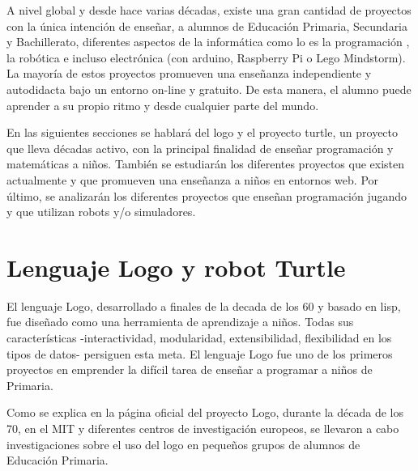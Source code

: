 A nivel global y desde hace varias décadas, existe una gran cantidad de proyectos con la única intención de enseñar, a alumnos de Educación Primaria, Secundaria y Bachillerato, diferentes aspectos de la informática como lo es la programación \cite{code-school,code-org,code-academy}, la robótica \cite{robomind-web,moway} e incluso electrónica (con \Gls{arduino}\cite{arduino}, Raspberry Pi\cite{raspberry-pi} o Lego Mindstorm\cite{lego-mindstorm-programar}).
La mayoría de estos proyectos promueven una enseñanza independiente y autodidacta bajo un entorno on-line y gratuito. De esta manera, el alumno puede aprender a su propio ritmo y desde cualquier parte del mundo.

En las siguientes secciones se hablará del \Gls{logo}\cite{logo} y el proyecto \Gls{turtle}\cite{logo-turtle}, un proyecto que lleva décadas activo, con la principal finalidad de enseñar programación y matemáticas a niños. También se estudiarán los diferentes proyectos que existen actualmente y que promueven una enseñanza a niños en entornos web. Por último, se analizarán los diferentes proyectos que enseñan programación jugando y que utilizan robots y/o simuladores.


\section{Lenguaje Logo y robot Turtle}
\label{sec:Logo}

El lenguaje Logo, desarrollado a finales de la decada de los 60 y basado en \Gls{lisp}, fue diseñado como una herramienta de aprendizaje a niños. Todas sus características -interactividad, modularidad, extensibilidad, flexibilidad en los tipos de datos- persiguen esta meta. El lenguaje Logo fue uno de los primeros proyectos en emprender la difícil tarea de enseñar a programar a niños de Primaria.


Como se explica en la página oficial del proyecto Logo\cite{logo}, durante la década de los 70, en el \acrfull{MIT} y diferentes centros de investigación europeos, se llevaron a cabo investigaciones sobre el uso del \Gls{logo} en pequeños grupos de alumnos de Educación Primaria.


